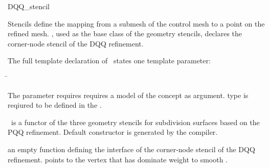\ccRefPageEnd
\ccRefPageBegin





\begin{ccRefClass}{DQQ_stencil}

\ccDefinition

Stencils define the mapping from a submesh of the control mesh to a 
point on the refined mesh. \ccClassTemplateName , used as the base 
class of the geometry stencils, declares the corner-node
stencil of the DQQ refinement. 


\ccParameters

The full template declaration of \ccClassTemplateName\ states one
template parameter:

\begin{tabbing}
 \=\\
\end{tabbing}
   
The  parameter requires requires a model of 
the  concept as argument.  
type is reqiured to be defined in the .

\ccCreation

\ccClassTemplateName\ is a functor of the three geometry stencils for
subdivision surfaces based on the PQQ refinement. Default constructor 
is generated by the compiler.


\ccThree{}{}{}

{an empty function defining the interface of the corner-node stencil 
of the DQQ refinement.  points to the vertex that has 
dominate weight to smooth .}

\ccSeeAlso

\\

\end{ccRefClass}

